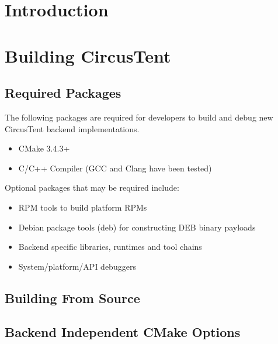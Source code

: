 \documentclass{article}
\begin{document}
\clearpage
\section{Introduction}
\label{sec:Introduction}

\clearpage
\section{Building CircusTent}
\label{sec:Building}

\subsection{Required Packages}
\label{sec:RequiredPackages}

The following packages are required for developers to build and debug 
new CircusTent backend implementations. 

\begin{itemize}
\item CMake 3.4.3+
\item C/C++ Compiler (GCC and Clang have been tested)
\end{itemize}

Optional packages that may be required include:

\begin{itemize}
\item RPM tools to build platform RPMs
\item Debian package tools (deb) for constructing DEB binary payloads
\item Backend specific libraries, runtimes and tool chains
\item System/platform/API debuggers
\end{itemize}

\subsection{Building From Source}
\label{sec:BuildingFromSource}

\subsection{Backend Independent CMake Options}
\label{sec:CMakeOptions}
\end{document}
